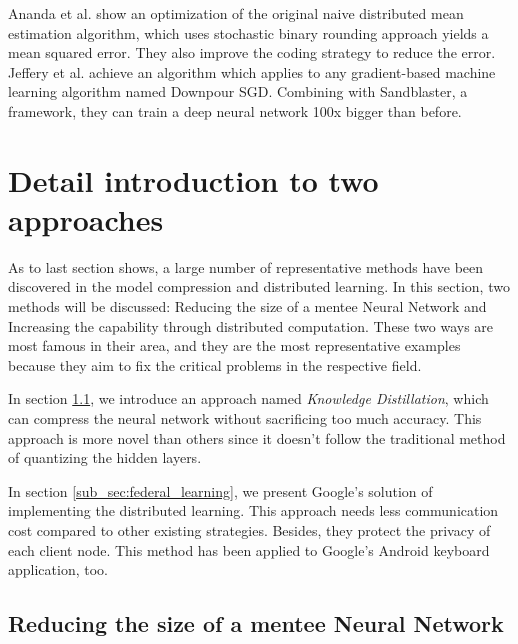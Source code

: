 \documentclass[article]{aaltoseries}
\begin{document}
Ananda et al.\cite{Suresh2016} show an optimization of the original naive distributed mean estimation algorithm, which uses 
stochastic binary rounding approach yields a mean squared error. They also improve the coding strategy to reduce the error.
Jeffery et al.\cite{NIPS2012_4687} achieve an algorithm which applies to any gradient-based 
machine learning algorithm named Downpour SGD.
Combining with Sandblaster, a framework, they can train a deep neural network 100x bigger than before.







\section{Detail introduction to two approaches}
\label{sec:approaches}





As to last section shows, a large number of representative methods have been discovered in the model compression and distributed learning. 
In this section, two methods will be discussed:
Reducing the size of a mentee Neural Network and Increasing the capability through distributed computation.
These two ways are most famous in their area, and they are the most representative examples because they
aim to fix the critical problems in the respective field.

In section \ref{sub_sec:reduce_size}, we introduce an approach named \emph{Knowledge Distillation},
which can compress the neural network without sacrificing too much accuracy. This approach is more novel
than others since it doesn't follow the traditional method of quantizing the hidden layers.


In section \ref{sub_sec:federal_learning}, we present Google's solution of implementing the distributed
learning. This approach needs less communication cost compared to other existing strategies. Besides, they 
protect the privacy of each client node. This method has been applied to Google's Android keyboard application,
too.


\subsection{Reducing the size of a mentee Neural Network}
\label{sub_sec:reduce_size}
\end{document}
